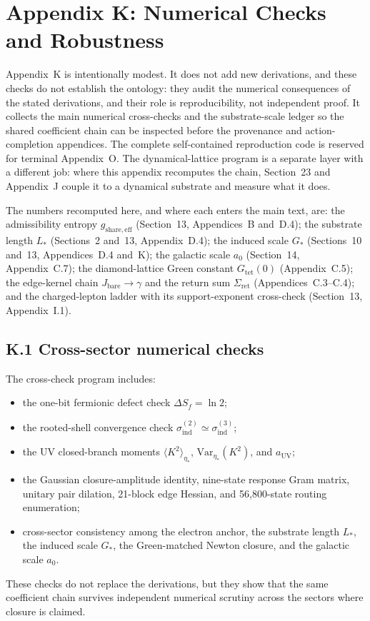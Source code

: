 \documentclass[11pt]{article}
\begin{document}
\section*{Appendix K: Numerical Checks and Robustness}

Appendix~K is intentionally modest. It does not add new derivations, and these checks do not establish the ontology: they audit the numerical consequences of the stated derivations, and their role is reproducibility, not independent proof. It collects the main numerical cross-checks and the substrate-scale ledger so the shared coefficient chain can be inspected before the provenance and action-completion appendices. The complete self-contained reproduction code is reserved for terminal Appendix~O. The dynamical-lattice program is a separate layer with a different job: where this appendix recomputes the chain, Section~23 and Appendix~J couple it to a dynamical substrate and measure what it does.

The numbers recomputed here, and where each enters the main text, are: the admissibility entropy $g_{\mathrm{share,eff}}$ (Section~13, Appendices~B and~D.4); the substrate length $L_*$ (Sections~2 and~13, Appendix~D.4); the induced scale $G_*$ (Sections~10 and~13, Appendices~D.4 and~K); the galactic scale $a_0$ (Section~14, Appendix~C.7); the diamond-lattice Green constant $G_{\mathrm{tet}}(0)$ (Appendix~C.5); the edge-kernel chain $J_{\mathrm{bare}}\to\gamma$ and the return sum $\Sigma_{\mathrm{ret}}$ (Appendices~C.3--C.4); and the charged-lepton ladder with its support-exponent cross-check (Section~13, Appendix~I.1).

\subsection*{K.1 Cross-sector numerical checks}

The cross-check program includes:
\begin{itemize}
\item the one-bit fermionic defect check $\Delta S_f=\ln 2$;
\item the rooted-shell convergence check $\sigma_{\mathrm{ind}}^{(2)}\simeq \sigma_{\mathrm{ind}}^{(3)}$;
\item the UV closed-branch moments $\langle K^2\rangle_{\eta_*}$, $\mathrm{Var}_{\eta_*}(K^2)$, and $a_{\mathrm{UV}}$;
\item the Gaussian closure-amplitude identity, nine-state response Gram matrix, unitary pair dilation, 21-block edge Hessian, and 56,800-state routing enumeration;
\item cross-sector consistency among the electron anchor, the substrate length $L_*$, the induced scale $G_*$, the Green-matched Newton closure, and the galactic scale $a_0$.
\end{itemize}
These checks do not replace the derivations, but they show that the same coefficient chain survives independent numerical scrutiny across the sectors where closure is claimed.
\end{document}
